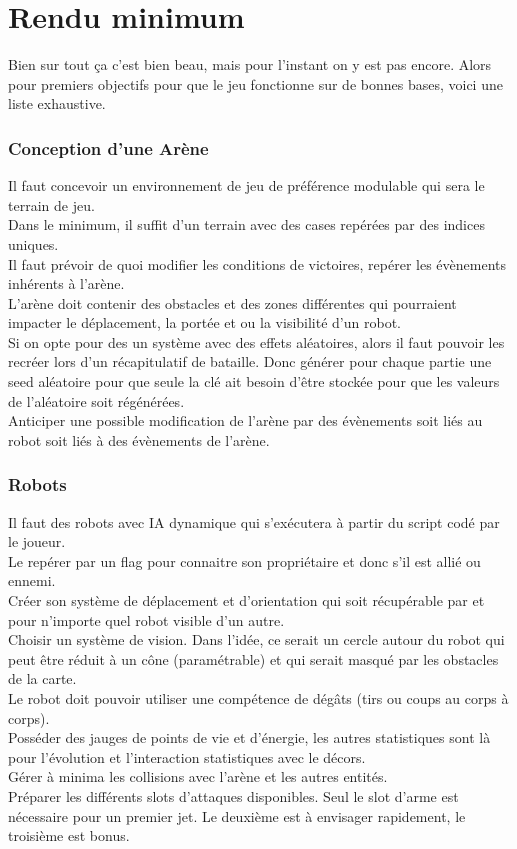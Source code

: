 \documentclass[10pt]{article}
\begin{document}
\part{Rendu minimum}
Bien sur tout ça c'est bien beau, mais pour l'instant on y est pas encore. Alors pour premiers objectifs pour que le jeu fonctionne sur de bonnes bases, voici une liste exhaustive.

\section{Conception d'une Arène}

Il faut concevoir un environnement de jeu de préférence modulable qui sera le terrain de jeu.\\
Dans le minimum, il suffit d'un terrain avec des cases repérées par des indices uniques.\\
Il faut prévoir de quoi modifier les conditions de victoires, repérer les évènements inhérents à l'arène.\\
L'arène doit contenir des obstacles et des zones différentes qui pourraient impacter le déplacement, la portée et ou la visibilité d'un robot.\\
Si on opte pour des un système avec des effets aléatoires, alors il faut pouvoir les recréer lors d'un récapitulatif de bataille. Donc générer pour chaque partie une seed aléatoire pour que seule la clé ait besoin d'être stockée pour que les valeurs de l'aléatoire soit régénérées.\\
Anticiper une possible modification de l'arène par des évènements soit liés au robot soit liés à des évènements de l'arène.

\section{Robots}

Il faut des robots avec IA dynamique qui s'exécutera à partir du script codé par le joueur.\\
Le repérer par un flag pour connaitre son propriétaire et donc s'il est allié ou ennemi.\\
Créer son système de déplacement et d'orientation qui soit récupérable par et pour n'importe quel robot visible d'un autre.\\
Choisir un système de vision. Dans l'idée, ce serait un cercle autour du robot qui peut être réduit à un cône (paramétrable) et qui serait masqué par les obstacles de la carte.\\
Le robot doit pouvoir utiliser une compétence de dégâts (tirs ou coups au corps à corps).\\
Posséder des jauges de points de vie et d'énergie, les autres statistiques sont là pour l'évolution et l'interaction statistiques avec le décors. \\
Gérer à minima les collisions avec l'arène et les autres entités.\\
Préparer les différents slots d'attaques disponibles. Seul le slot d'arme est nécessaire pour un premier jet. Le deuxième est à envisager rapidement, le troisième est bonus.
\end{document}
